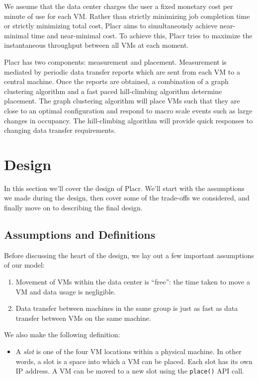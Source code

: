 \documentclass[11pt]{article}
\begin{document}
We assume that the data center charges the user a fixed monetary cost per minute of use for each VM.  Rather than strictly minimizing job completion time or strictly minimizing total cost, Placr aims to simultaneously achieve near-minimal time and near-minimal cost.  To achieve this, Placr tries to maximize the instantaneous throughput between all VMs at each moment.

Placr has two components: measurement and placement.  Measurement is mediated by periodic data transfer reports which are sent from each VM to a central machine.  Once the reports are obtained, a combination of a graph clustering algorithm and a fast paced hill-climbing algorithm determine placement. The graph clustering algorithm will place VMs such that they are close to an optimal configuration and respond to macro scale events such as large changes in occupancy.  The hill-climbing algorithm will provide quick responses to changing data transfer requirements.

\section{Design}

In this section we'll cover the design of Placr.  We'll start with the assumptions we made during the design, then cover some of the trade-offs we considered, and finally move on to describing the final design.

\subsection{Assumptions and Definitions}
Before discussing the heart of the design, we lay out a few important assumptions of our model:
\begin{enumerate}[noitemsep]
  \item Movement of VMs within the data center is ``free'': the time taken to move a VM and data usage is negligible.
  \item Data transfer between machines in the same group is just as fast as data transfer between VMs on the same machine.
\end{enumerate}
We also make the following definition:
\begin{itemize}
  \item A {\em slot} is one of the four VM locations within a physical machine.  In other words, a slot is a space into which a VM can be placed.  Each slot has its own IP address.  A VM can be moved to a new slot using the {\tt place()} API call.
\end{itemize}
\end{document}
